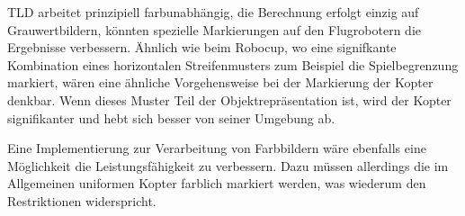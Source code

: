 		TLD arbeitet prinzipiell farbunabhängig, die Berechnung erfolgt einzig auf Grauwertbildern, könnten spezielle Markierungen auf den Flugrobotern die Ergebnisse verbessern. Ähnlich wie beim Robocup, wo eine signifkante Kombination eines horizontalen Streifenmusters zum Beispiel die Spielbegrenzung markiert, wären eine ähnliche Vorgehensweise bei der Markierung der Kopter denkbar. Wenn dieses Muster Teil der Objektrepräsentation ist, wird der Kopter signifikanter und hebt sich besser von seiner Umgebung ab. 

		Eine Implementierung zur Verarbeitung von Farbbildern wäre ebenfalls eine Möglichkeit die Leistungsfähigkeit zu verbessern. Dazu müssen allerdings die im Allgemeinen uniformen Kopter farblich markiert werden, was wiederum den Restriktionen widerspricht. 

